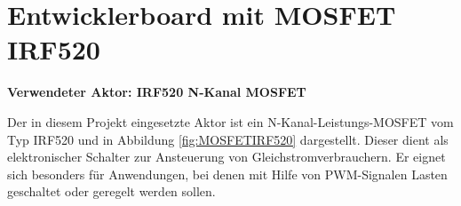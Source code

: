 \section{Entwicklerboard mit MOSFET IRF520}

\textbf{Verwendeter Aktor: IRF520 N-Kanal MOSFET}

Der in diesem Projekt eingesetzte Aktor ist ein N-Kanal-Leistungs-MOSFET vom Typ IRF520 und in Abbildung \ref{fig:MOSFETIRF520} dargestellt. Dieser dient als elektronischer Schalter zur Ansteuerung von Gleichstromverbrauchern. Er eignet sich besonders für Anwendungen, bei denen mit Hilfe von PWM-Signalen Lasten geschaltet oder geregelt werden sollen. \cite{OpenPlatform.cc.2020}

\begin{center}
\begin{tikzpicture}
    

\end{tikzpicture}
\end{center}
